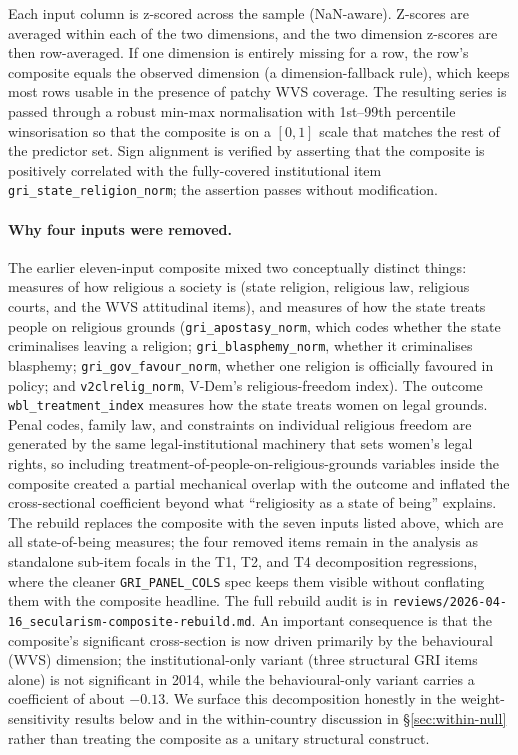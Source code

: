 \documentclass[12pt,a4paper]{article}
\begin{document}
Each input column is z-scored across the sample (NaN-aware). Z-scores are averaged within each of the two dimensions, and the two dimension z-scores are then row-averaged. If one dimension is entirely missing for a row, the row's composite equals the observed dimension (a dimension-fallback rule), which keeps most rows usable in the presence of patchy WVS coverage. The resulting series is passed through a robust min-max normalisation with 1st--99th percentile winsorisation so that the composite is on a $[0, 1]$ scale that matches the rest of the predictor set. Sign alignment is verified by asserting that the composite is positively correlated with the fully-covered institutional item \texttt{gri\_state\_religion\_norm}; the assertion passes without modification.

\paragraph{Why four inputs were removed.} The earlier eleven-input composite mixed two conceptually distinct things: measures of how religious a society is (state religion, religious law, religious courts, and the WVS attitudinal items), and measures of how the state treats people on religious grounds (\texttt{gri\_apostasy\_norm}, which codes whether the state criminalises leaving a religion; \texttt{gri\_blasphemy\_norm}, whether it criminalises blasphemy; \texttt{gri\_gov\_favour\_norm}, whether one religion is officially favoured in policy; and \texttt{v2clrelig\_norm}, V-Dem's religious-freedom index). The outcome \texttt{wbl\_treatment\_index} measures how the state treats women on legal grounds. Penal codes, family law, and constraints on individual religious freedom are generated by the same legal-institutional machinery that sets women's legal rights, so including treatment-of-people-on-religious-grounds variables inside the composite created a partial mechanical overlap with the outcome and inflated the cross-sectional coefficient beyond what ``religiosity as a state of being'' explains. The rebuild replaces the composite with the seven inputs listed above, which are all state-of-being measures; the four removed items remain in the analysis as standalone sub-item focals in the T1, T2, and T4 decomposition regressions, where the cleaner \texttt{GRI\_PANEL\_COLS} spec keeps them visible without conflating them with the composite headline. The full rebuild audit is in \texttt{reviews/2026-04-16\_secularism-composite-rebuild.md}. An important consequence is that the composite's significant cross-section is now driven primarily by the behavioural (WVS) dimension; the institutional-only variant (three structural GRI items alone) is not significant in 2014, while the behavioural-only variant carries a coefficient of about $-0.13$. We surface this decomposition honestly in the weight-sensitivity results below and in the within-country discussion in \S\ref{sec:within-null} rather than treating the composite as a unitary structural construct.
\end{document}
